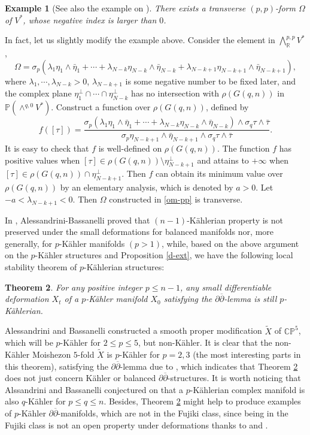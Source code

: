 \documentclass[12pt]{amsart}
\numberwithin{equation}{section}
\newtheorem{theorem} {Theorem} [section]
\newtheorem{example}  [theorem]     {Example}
\renewcommand{\1}{\mathds{1}}
\newcommand{\db}{\overline{\partial}}
\renewcommand{\>}{\rightarrow}
\newcommand{\p}{\partial}
\def\p{\partial}
\begin{document}
\begin{example}[{See also the example on \cite[Page 50]{HK}}]
There exists a transverse $(p,p)$-form $\Omega$ of $V^*$, whose negative
index is larger than $0$.
\end{example}
In fact, let us slightly modify the example above. Consider the
element in $\bigwedge^{p,p}_{\mathbb{R}}V^*$,
\begin{equation}\label{om-pp}
\Omega=\sigma_p(\lambda_1\eta_1\wedge\bar\eta_1+\cdots+\lambda_{N-k}\eta_{N-k}\wedge\bar\eta_{N-k}+\lambda_{N-k+1}\eta_{N-k+1}\wedge\bar\eta_{N-k+1}),
\end{equation}
where $\lambda_1,\cdots,\lambda_{N-k}>0$, $\lambda_{N-k+1}$ is some
negative number to be fixed later, and the complex plane
$\eta_1^\perp\cap\cdots\cap\eta_{N-k}^\perp$ has no intersection
with $\rho(G(q,n))$ in $\mathbb{P}(\wedge^{q,0}V^*)$. Construct a
function over $\rho(G(q,n))$, defined by
$$f([\tau])=\frac{\sigma_p(\lambda_1\eta_1\wedge\bar\eta_1+\cdots+\lambda_{N-k}\eta_{N-k}\wedge\bar\eta_{N-k})\wedge\sigma_{q}\tau\wedge\bar\tau}
{\sigma_p\eta_{N-k+1}\wedge\bar\eta_{N-k+1}\wedge\sigma_{q}\tau\wedge\bar\tau}.$$
It is easy to check that $f$ is well-defined on $\rho(G(q,n))$. The
function $f$ has positive values when $[\tau]\in
\rho(G(q,n))\setminus \eta^\perp_{N-k+1}$ and attains to $+\infty$
when $[\tau]\in \rho(G(q,n))\cap\eta^\perp_{N-k+1}$. Then $f$ can
obtain its minimum value over $\rho(G(q,n))$ by an elementary
analysis, which is denoted by $a>0$. Let $-a<\lambda_{N-k+1}<0$.
Then $\Omega$ constructed in \eqref{om-pp} is transverse.


In \cite{ab}, Alessandrini-Bassanelli proved that
$(n-1)$-K\"ahlerian property is not preserved under the small
deformations for balanced manifolds nor, more generally, for
$p$-K\"ahler manifolds  $(p > 1)$, while, based on the above argument
on the $p$-K\"ahler structures and Proposition \ref{d-ext},
we have the following local stability theorem of $p$-K\"ahlerian structures:
\begin{theorem}\label{c-p-kahler}
For any positive integer $p\leq n-1$, any
small differentiable deformation $X_t$ of a
$p$-K\"ahler manifold $X_0$ satisfying the $\p\db$-lemma is still
$p$-K\"ahlerian.
\end{theorem}

Alessandrini and Bassanelli \cite[Section 4]{aabb} constructed a
smooth proper modification $\tilde{X}$ of $\mathbb{CP}^5$, which
will be $p$-K\"ahler for $2 \leq p \leq 5$, but non-K\"ahler. It is
clear that the non-K\"ahler Moishezon $5$-fold $\tilde{X}$ is
$p$-K\"ahler for $p=2,3$ (the most interesting parts in this
theorem), satisfying the $\p \db$-lemma due to \cite{DGMS}, which
indicates that Theorem \ref{c-p-kahler} does not just concern
K\"ahler or balanced $\p \db$-structures. It is worth noticing  that
Alssandrini and Bassanelli conjectured on \cite[Page $299$]{aabb}
that a $p$-K\"ahlerian complex manifold is also $q$-K\"ahler for
$p\leq q\leq n$. Besides, Theorem \ref{c-p-kahler} might help to
produce examples of $p$-K\"ahler $\p \db$-manifolds, which are not
in the Fujiki class, since being in the Fujiki class is not an open
property under deformations thanks to \cite{Cam} and \cite{LP}.
\end{document}
